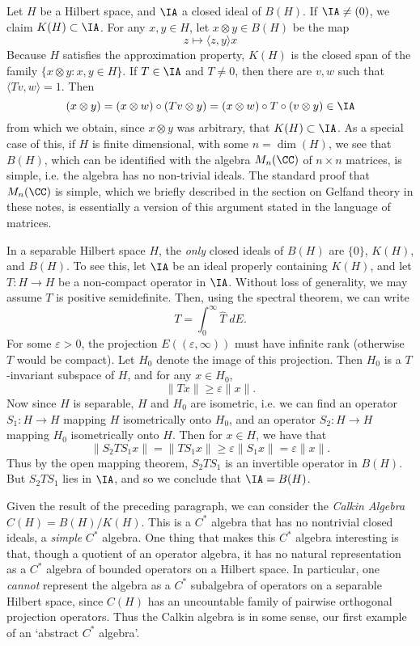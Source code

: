 \begin{example}
    Let $H$ be a Hilbert space, and $\IA$ a closed ideal of $B(H)$. If $\IA \neq (0)$, we claim $K(H) \subset \IA$. For any $x,y \in H$, let $x \otimes y \in B(H)$ be the map
    \[ z \mapsto \langle z, y \rangle x \]
    Because $H$ satisfies the approximation property, $K(H)$ is the closed span of the family $\{ x \otimes y: x,y \in H \}$. If $T \in \IA$ and $T \neq 0$, then there are $v,w$ such that $\langle Tv, w \rangle = 1$. Then
    \[ (x \otimes y) = (x \otimes w) \circ (Tv \otimes y) = (x \otimes w) \circ T \circ (v \otimes y) \in \IA \]
    from which we obtain, since $x \otimes y$ was arbitrary, that $K(H) \subset \IA$. As a special case of this, if $H$ is finite dimensional, with some $n = \dim(H)$, we see that $B(H)$, which can be identified with the algebra $M_n(\CC)$ of $n \times n$ matrices, is simple, i.e. the algebra has no non-trivial ideals. The standard proof that $M_n(\CC)$ is simple, which we briefly described in the section on Gelfand theory in these notes, is essentially a version of this argument stated in the language of matrices.

    In a separable Hilbert space $H$, the \emph{only} closed ideals of $B(H)$ are $\{ 0 \}$, $K(H)$, and $B(H)$. To see this, let $\IA$ be an ideal properly containing $K(H)$, and let $T: H \to H$ be a non-compact operator in $\IA$. Without loss of generality, we may assume $T$ is positive semidefinite. Then, using the spectral theorem, we can write
    \[ T = \int_0^\infty \widehat{T}\; dE. \]
    For some $\varepsilon > 0$, the projection $E((\varepsilon,\infty))$ must have infinite rank (otherwise $T$ would be compact). Let $H_0$ denote the image of this projection. Then $H_0$ is a $T$-invariant subspace of $H$, and for any $x \in H_0$,
    \[ \| Tx \| \geq \varepsilon \| x \|. \]
    Now since $H$ is separable, $H$ and $H_0$ are isometric, i.e. we can find an operator $S_1: H \to H$ mapping $H$ isometrically onto $H_0$, and an operator $S_2: H \to H$ mapping $H_0$ isometrically onto $H$. Then for $x \in H$, we have that
    \[ \| S_2 T S_1 x \| = \| T S_1 x \| \geq \varepsilon \| S_1 x \| = \varepsilon \| x \|. \]
    Thus by the open mapping theorem, $S_2 T S_1$ is an invertible operator in $B(H)$. But $S_2 T S_1$ lies in $\IA$, and so we conclude that $\IA = B(H)$.

    Given the result of the preceding paragraph, we can consider the \emph{Calkin Algebra} $C(H) = B(H)/K(H)$. This is a $C^*$ algebra that has no nontrivial closed ideals, a \emph{simple} $C^*$ algebra. One thing that makes this $C^*$ algebra interesting is that, though a quotient of an operator algebra, it has no natural representation as a $C^*$ algebra of bounded operators on a Hilbert space. In particular, one \emph{cannot} represent the algebra as a $C^*$ subalgebra of operators on a separable Hilbert space, since $C(H)$ has an uncountable family of pairwise orthogonal projection operators. Thus the Calkin algebra is in some sense, our first example of an `abstract $C^*$ algebra'.
\end{example}

